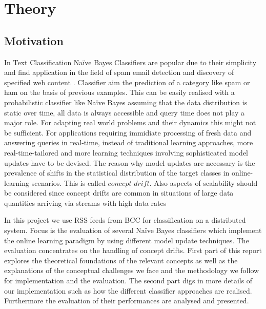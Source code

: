 \documentclass[12pt]{article}
\begin{document}


\renewcommand{\contentsname}{Table of Contents}
\tableofcontents

\newpage
\section{Theory}
\subsection{Motivation}
\begin{spacing}{1.2}
In Text Classification Na\"ive Bayes Classifiers are popular due to their simplicity and find application in the field of spam email detection and discovery of specified web content \citep[p. 225]{ertel2008}. Classifier aim the prediction of a category like spam or ham on the basis of previous examples. This can be easily realised with a probabilistic classifier like Na\"ive Bayes assuming that the data distribution is static over time, all data is always accessible and query time does not play a major role. For adapting real world problems and their dynamics this might not be sufficient. For applications requiring immidiate processing of fresh data and answering queries in real-time, instead of traditional learning approaches, more real-time-tailored and more learning techniques involving sophisticated model updates have to be devised. The reason why model updates are necessary is the prevalence of shifts in the statistical distribution of the target classes in online-learning scenarios. This is called $concept$ $drift$. Also aspects of scalability should be considered since concept drifts are common in situations of large data quantities arriving via streams with high data rates \citep[p. 4]{tsymbal2004}   

In this project we use RSS feeds from BCC for classification on a distributed system. Focus is the evaluation of several Na\"ive Bayes classifiers which implement the online learning paradigm by using different model update techniques.  The evaluation concentrates on the handling of concept drifts. First part of this report explores the theoretical foundations of the relevant concepts as well as the explanations of the conceptual challenges we face and the methodology we follow for implementation and the evaluation. The second part digs in more details of our implementation such as how the different classifier approaches are realised. Furthermore the evaluation of their performances are analysed and presented.

\end{spacing}
\end{document}
